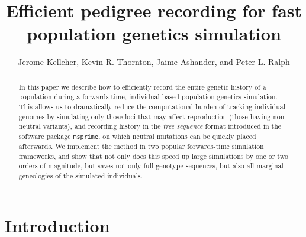 \documentclass{article}
\newcommand{\msprime}{\texttt{msprime}}
\begin{document}
\title{Efficient pedigree recording for fast population genetics simulation}
\author{Jerome Kelleher,
        Kevin R. Thornton,
        Jaime Ashander, and
        Peter L. Ralph}
\maketitle



\begin{abstract}
    In this paper we describe how to
    efficiently record the entire genetic history of a population
    during a forwards-time, individual-based population genetics simulation.
    This allows us to dramatically reduce the computational burden of tracking individual genomes
    by simulating only those loci that may affect reproduction (those having non-neutral variants),
    and recording history in the \emph{tree sequence} format introduced in the software package \msprime,
    on which neutral mutations can be quickly placed afterwards.
    We implement the method in two popular forwards-time simulation frameworks,
    and show that not only does this speed up large simulations by one or two orders of magnitude,
    but saves not only full genotype sequences, but also all marginal
    geneologies of the simulated individuals.
\end{abstract}



\section*{Introduction}
\end{document}
